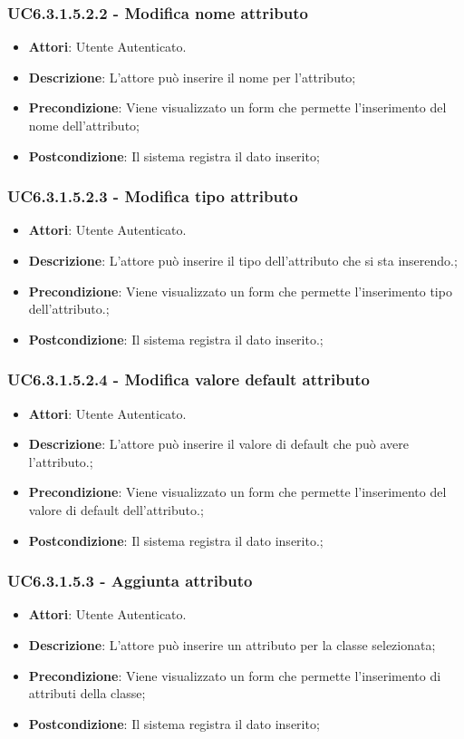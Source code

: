 \subsubsection{UC6.3.1.5.2.2 - Modifica nome attributo} 
\label{sssec:UC6.3.1.5.2.2} 
\begin{itemize} 
\item \textbf{Attori}: Utente Autenticato.
\item \textbf{Descrizione}: L'attore può inserire il nome per l'attributo;
\item \textbf{Precondizione}: Viene visualizzato un form che permette l'inserimento del nome dell'attributo;
\item \textbf{Postcondizione}: Il sistema registra il dato inserito;
\end{itemize} 
\subsubsection{UC6.3.1.5.2.3 - Modifica tipo attributo} 
\label{sssec:UC6.3.1.5.2.3} 
\begin{itemize} 
\item \textbf{Attori}: Utente Autenticato.
\item \textbf{Descrizione}: L'attore può inserire il tipo dell'attributo che si sta inserendo.;
\item \textbf{Precondizione}: Viene visualizzato un form che permette l'inserimento tipo dell'attributo.;
\item \textbf{Postcondizione}: Il sistema registra il dato inserito.;
\end{itemize} 
\subsubsection{UC6.3.1.5.2.4 - Modifica valore default attributo} 
\label{sssec:UC6.3.1.5.2.4} 
\begin{itemize} 
\item \textbf{Attori}: Utente Autenticato.
\item \textbf{Descrizione}: L'attore può inserire il valore di default che può avere l'attributo.;
\item \textbf{Precondizione}: Viene visualizzato un form che permette l'inserimento del valore di default dell'attributo.;
\item \textbf{Postcondizione}: Il sistema registra il dato inserito.;
\end{itemize} 
\subsubsection{UC6.3.1.5.3 - Aggiunta attributo} 
\label{sssec:UC6.3.1.5.3} 
\begin{itemize} 
\item \textbf{Attori}: Utente Autenticato.
\item \textbf{Descrizione}: L'attore può inserire un attributo per la classe selezionata;
\item \textbf{Precondizione}: Viene visualizzato un form che permette l'inserimento di attributi della classe;
\item \textbf{Postcondizione}: Il sistema registra il dato inserito;
\end{itemize} 
